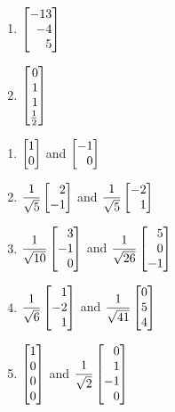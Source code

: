 \begin{exercises}
\begin{problist}
\begin{enumerate}
			\item $\mat{-13\\-4\\5}$
			\item $\mat{0\\1\\1\\\frac{1}{2}}$
		\end{enumerate}
		\begin{solution}
			\begin{enumerate}
				\item $\mat{1\\0}$ and $\mat{-1\\0}$
				\item $\dfrac{1}{\sqrt{5}}\mat{2\\-1}$ and $\dfrac{1}{\sqrt{5}}\mat{-2\\1}$
				\item $\dfrac{1}{\sqrt{10}}\mat{3\\-1\\0}$ and $\dfrac{1}{\sqrt{26}}\mat{5\\0\\-1}$
				\item $\dfrac{1}{\sqrt{6}}\mat{1\\-2\\1}$ and $\dfrac{1}{\sqrt{41}}\mat{0\\5\\4}$
				\item $\mat{1\\0\\0\\0}$ and $\dfrac{1}{\sqrt{2}}\mat{0\\1\\-1\\0}$
			\end{enumerate}
		\end{solution}
		

\end{problist}
\end{exercises}
